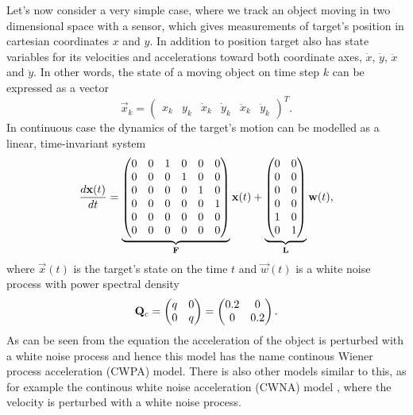 Let's now consider a very simple case, where we track an object moving
in two dimensional space with a sensor, which gives measurements of
target's position in cartesian coordinates $x$ and $y$. In addition to
position target also has state variables for its velocities and accelerations toward both coordinate
axes, $\dot{x}$, $\dot{y}$, $\ddot{x}$ and $\ddot{y}$. In other words, the state of a
moving object on time step $k$ can be expressed as a vector
%
\begin{equation}
\vec{x}_k = 
\begin{pmatrix}
x_k & y_k & \dot{x}_k & \dot{y}_k & \ddot{x}_k & \ddot{y}_k
\end{pmatrix}^T.
%
\end{equation}
%
In continuous case the dynamics of the target's motion can be modelled as a linear, time-invariant system
%
\begin{equation}
%
\frac{d \vec{x}(t)}{dt} = \underbrace{\begin{pmatrix}
0 & 0 & 1 & 0 & 0 & 0 \\
0 & 0 & 0 & 1 & 0 & 0 \\
0 & 0 & 0 & 0 & 1 & 0 \\
0 & 0 & 0 & 0 & 0 & 1 \\
0 & 0 & 0 & 0 & 0 & 0 \\
0 & 0 & 0 & 0 & 0 & 0 
\end{pmatrix}}_{\mat{F}} \vec{x}(t)
+
\underbrace{\begin{pmatrix}
0 & 0 \\
0 & 0 \\
0 & 0 \\
0 & 0 \\
1 & 0 \\
0 & 1 \\
\end{pmatrix}}_{\mat{L}}\vec{w}(t), \label{eq:cwpa_cont_model}
%
\end{equation}
%
where $\vec{x}(t)$ is the target's state on the time $t$ and
$\vec{w}(t)$ is a white noise process with power spectral density
%
\begin{equation}
\mathbf{Q}_c = 
\begin{pmatrix}
q & 0 \\
0   & q
\end{pmatrix}
= 
\begin{pmatrix}
0.2 & 0 \\
0   & 0.2
\end{pmatrix}.
\end{equation}
%
As can be seen from the equation the acceleration of the object is perturbed with a white noise process and hence this model has the name continous Wiener process acceleration (CWPA) model. There is also other models similar to this, as for example the continous white noise acceleration (CWNA) model \citep{Bar-Shalom+Li+Kirubarajan:2001}, where the velocity is perturbed with a white noise process.

